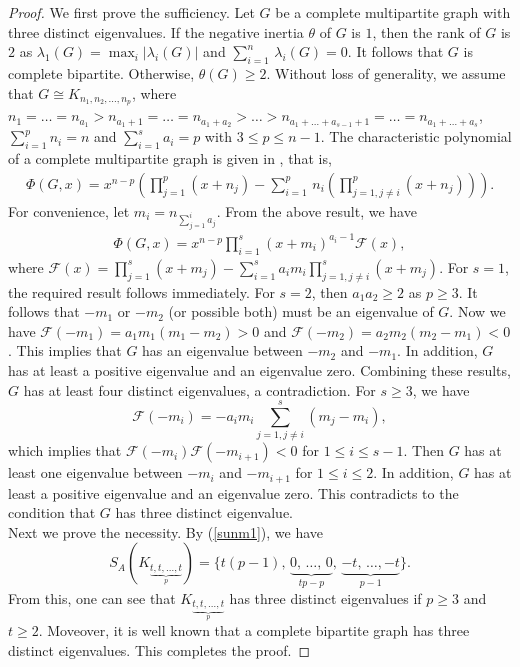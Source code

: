 \documentclass[12pt]{article}
\begin{document}
\begin{proof} We first prove the sufficiency. Let $G$ be a complete multipartite graph with three distinct eigenvalues. If the negative inertia $\theta$ of $G$ is $1$, then the rank of $G$ is $2$ as $\lambda_1(G)=\max_{i}{|\lambda_i(G)|}$ and $\sum\limits^n_{i=1}\,\lambda_i(G)=0$. It follows that $G$ is complete bipartite.
 Otherwise, $\theta(G)\geq 2$. Without loss of generality, we
 assume that $G\cong K_{n_1, n_2,\dots,n_p}$, where $n_1=\dots=n_{a_1}>n_{a_1+1}=\dots=n_{a_1+a_2}>\dots>n_{a_1+\dots+a_{s-1}+1}=
 \dots=n_{a_1+\dots+a_s}$, $\sum\limits_{i=1}^p n_i=n$ and $\sum\limits_{i=1}^s a_i=p$ with $3\leq p\leq n-1$.
 The characteristic polynomial of a complete multipartite graph is
given in \cite{A}, that is,
 \begin{eqnarray*}
 \Phi(G, x)=x^{n-p}\left(\prod_{j=1}^{p}(x+n_j)-\sum_{i=1}^{p}\,n_i\left(\prod_{j=1,j\neq
 i}^{p}(x+n_j)\right)\right).
 \end{eqnarray*}
 For convenience, let $m_i= n_{\sum_{j=1}^ia_j}$.
 From the above result, we have
 \begin{eqnarray}
 \Phi(G,x)=x^{n-p}\prod_{i=1}^{s}(x+m_i)^{a_i-1}\mathcal{F}(x)\label{sunm1},
 \end{eqnarray}
 where $\mathcal{F}(x)=\prod_{j=1}^{s}
 (x+m_j)-\sum_{i=1}^{s}a_i m_i\prod_{j=1,j\neq i}^{s}(x+m_j)$.
 For $s=1$, the required result follows immediately.
 For $s=2$, then $a_1a_2\geq 2$ as $p\geq 3$. It follows that $-m_1$ or $-m_2$ (or possible both) must be an eigenvalue of $G$. Now we have
 $\mathcal{F}(-m_1)=a_1m_1(m_1-m_2)>0$ and
 $\mathcal{F}(-m_2)=a_2m_2(m_2-m_1)<0$. This implies that $G$ has
 an eigenvalue between $-m_2$ and $-m_1$. In addition, $G$ has at
 least a positive eigenvalue and an eigenvalue zero. Combining these
 results, $G$ has at least four distinct eigenvalues, a contradiction.
 For $s\geq 3$, we have
 $$\mathcal{F}(-m_i)=-a_im_i\sum\limits_{j=1,j\neq i}^s(m_j-m_i),$$
 which implies that $\mathcal{F}(-m_i)\mathcal{F}(-m_{i+1})<0$ for $1\leq i\leq s-1$.
 Then $G$ has at least one eigenvalue between $-m_i$ and $-m_{i+1}$ for
 $1\leq i\leq 2$. In addition, $G$ has at
 least a positive eigenvalue and an eigenvalue zero. This
 contradicts to the condition that $G$ has three distinct
 eigenvalue.\\
 \noindent
 Next we prove the necessity. By (\ref{sunm1}), we have
 \begin{equation}
 S_A(K_{\underbrace{t,t,\dots,t}_p})=\Big\{t(p-1),\,\underbrace{0,\,\ldots,\,0}_{tp-p},\,\underbrace{-t,\,\ldots,
 -t}_{p-1}\Big\}.\label{sunm2}
 \end{equation}
 From this, one can see that $K_{\underbrace{t,t,\dots,t}_p}$ has
 three distinct eigenvalues if $p\geq 3$ and $t\geq 2$. Moveover, it is well known that a complete bipartite graph has three distinct eigenvalues. This completes the proof.
\end{proof}
\end{document}
